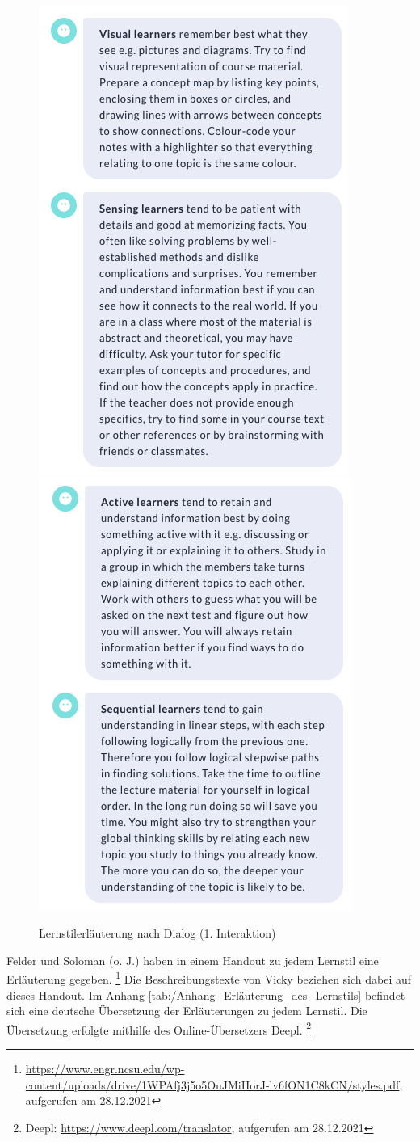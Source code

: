 \begin{figure}[H]
  \centering
  \includegraphics[width=0.45\linewidth]{images/Talk_roterMarker/LS12.png}
  \includegraphics[width=0.45\linewidth]{images/Talk_roterMarker/LS34.png}
 \caption[Lernstilerläuterung nach Dialog (1. Interaktion)] {Lernstilerläuterung nach Dialog (1. Interaktion)}
\label{fig:Lernstilerläuterung}
\end{figure} 

Felder und Soloman (o. J.) haben in einem Handout zu jedem Lernstil
eine Erläuterung gegeben. \footnote{\url{https://www.engr.ncsu.edu/wp-content/uploads/drive/1WPAfj3j5o5OuJMiHorJ-lv6fON1C8kCN/styles.pdf}, aufgerufen am 28.12.2021}
Die Beschreibungstexte von Vicky beziehen sich dabei auf dieses Handout.
Im Anhang \ref{tab:/Anhang_Erläuterung_des_Lernstils} befindet sich eine deutsche Übersetzung 
der Erläuterungen zu jedem Lernstil. Die Übersetzung erfolgte mithilfe des Online-Übersetzers \glqq Deepl\grqq{}. \footnote{Deepl: \url{https://www.deepl.com/translator}, aufgerufen am 28.12.2021}


